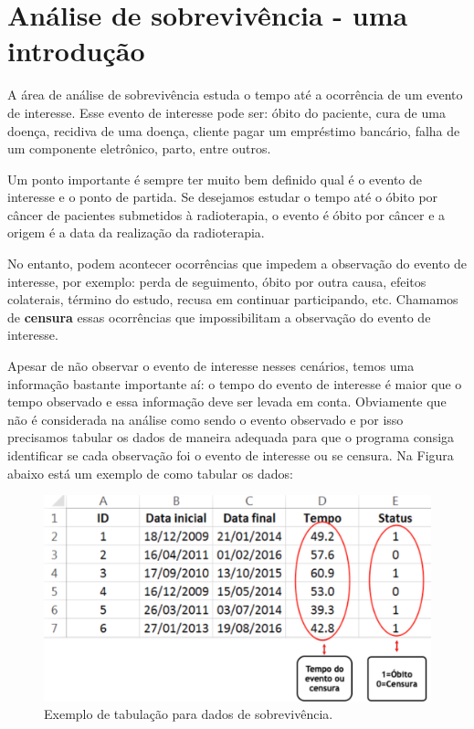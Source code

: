 \documentclass[
]{book}
\begin{document}
\hypertarget{anuxe1lise-de-sobrevivuxeancia---uma-introduuxe7uxe3o}{%
\chapter{Análise de sobrevivência - uma introdução}\label{anuxe1lise-de-sobrevivuxeancia---uma-introduuxe7uxe3o}}

A área de análise de sobrevivência estuda o tempo até a ocorrência de um evento de interesse. Esse evento de interesse pode ser: óbito do paciente, cura de uma doença, recidiva de uma doença, cliente pagar um empréstimo bancário, falha de um componente eletrônico, parto, entre outros.

Um ponto importante é sempre ter muito bem definido qual é o evento de interesse e o ponto de partida. Se desejamos estudar o tempo até o óbito por câncer de pacientes submetidos à radioterapia, o evento é óbito por câncer e a origem é a data da realização da radioterapia.

No entanto, podem acontecer ocorrências que impedem a observação do evento de interesse, por exemplo: perda de seguimento, óbito por outra causa, efeitos colaterais, término do estudo, recusa em continuar participando, etc. Chamamos de \textbf{censura} essas ocorrências que impossibilitam a observação do evento de interesse.

Apesar de não observar o evento de interesse nesses cenários, temos uma informação bastante importante aí: o tempo do evento de interesse é maior que o tempo observado e essa informação deve ser levada em conta. Obviamente que não é considerada na análise como sendo o evento observado e por isso precisamos tabular os dados de maneira adequada para que o programa consiga identificar se cada observação foi o evento de interesse ou se censura. Na Figura abaixo está um exemplo de como tabular os dados:

\begin{figure}
\includegraphics[width=1\linewidth]{figures/tabulacao_sobrev} \caption{Exemplo de tabulação para dados de sobrevivência.}\label{fig:unnamed-chunk-216}
\end{figure}
\end{document}
